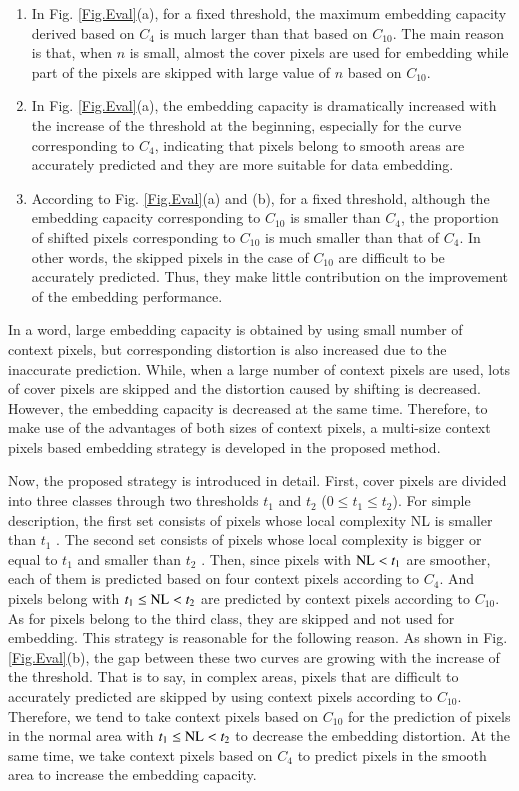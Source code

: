 \documentclass[review,3p,10pt,sort&compress]{elsarticle}
\begin{document}
\begin{enumerate}
  \item In Fig. \ref{Fig.Eval}(a), for a fixed threshold, the maximum embedding capacity derived based on $C_4$ is much larger than that based on $C_{10}$. The main reason is that, when $n$ is small, almost the cover pixels are used for embedding while part of the pixels are skipped with large value of $n$ based on $C_{10}$.
  \item In Fig. \ref{Fig.Eval}(a), the embedding capacity is dramatically increased with the increase of the threshold at the beginning, especially for the curve corresponding to $C_{4}$, indicating that pixels belong to smooth areas are accurately predicted and they are more suitable for data embedding.
  \item According to Fig. \ref{Fig.Eval}(a) and (b), for a fixed threshold, although the embedding capacity corresponding to $C_{10}$ is smaller than $C_4$, the proportion of shifted pixels corresponding to $C_{10}$ is much smaller than that of $C_{4}$. In other words, the skipped pixels in the case of $C_{10}$ are difficult to be accurately predicted. Thus, they make little contribution on the improvement of the embedding performance.
\end{enumerate}
In a word, large embedding capacity is obtained by using small number of context pixels, but corresponding distortion is also increased due to the inaccurate prediction. While, when a large number of context pixels are used, lots of cover pixels are skipped and the distortion caused by shifting is decreased. However, the embedding capacity is decreased at the same time. Therefore, to make use of the advantages of both sizes of context pixels, a multi-size context pixels based embedding strategy is developed in the proposed method.

Now, the proposed strategy is introduced in detail. First, cover pixels are divided into three classes through two thresholds $t_1$ and $t_2$ ($0 \leq t_1 \leq t_2$). For simple description, the first set consists of pixels whose local complexity NL is smaller than $t_1$
. The second set consists of pixels whose local complexity is bigger or equal to $t_1$ and smaller than $t_2$
. Then, since pixels with ${\rm NL} < t_1$ are smoother, each of them is predicted based on four context pixels according to $C_4$. And pixels belong with $t_1 \leq {\rm NL} < t_2$ are predicted by context pixels according to $C_{10}$. As for pixels belong to the third class, they are skipped and not used for embedding. This strategy is reasonable for the following reason. As shown in Fig. \ref{Fig.Eval}(b), the gap between these two curves are growing with the increase of the threshold. That is to say, in complex areas, pixels that are difficult to accurately predicted are skipped by using context pixels according to $C_{10}$. Therefore, we tend to take context pixels based on $C_{10}$ for the prediction of pixels in the normal area with $t_1 \leq {\rm NL} < t_2$ to decrease the embedding distortion. At the same time, we take context pixels based on $C_{4}$ to predict pixels in the smooth area to increase the embedding capacity.
\end{document}
